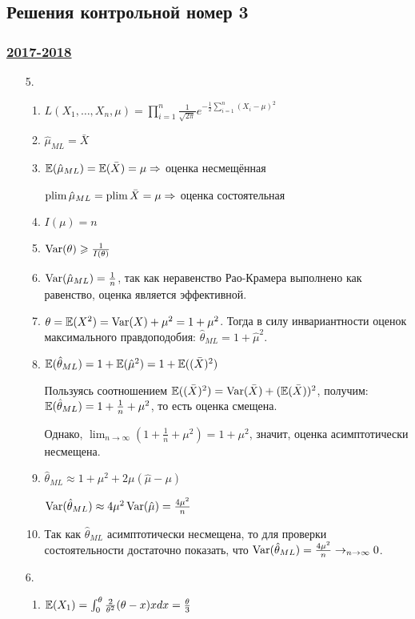 \subsection*{Решения контрольной номер 3}

\subsubsection*{\hyperref[sec:kr_03_2017_2018]{2017-2018}}
\label{sec:sol_kr_03_2017_2018}


\begin{enumerate}
\item[5.]
\begin{enumerate}
\item $L(X_1, \ldots, X_n, \mu) = \prod_{i=1}^n \frac{1}{\sqrt{2\pi}} e^{-\frac{1}{2}\sum_{i=1}^n (X_i - \mu)^2}$
\item $\hat\mu_{ML} = \bar X$
\item $\operatorname{\mathbb{E}}(\hat\mu_{ML}) = \operatorname{\mathbb{E}}(\bar X) = \mu \Rightarrow$ оценка несмещённая

$\operatorname*{plim} \hat \mu_{ML} = \operatorname*{plim} \bar X = \mu \Rightarrow$ оценка состоятельная
\item $I(\mu) = n$
\item $\operatorname{Var}(\theta) \geqslant \frac{1}{I(\theta)}$
\item $\operatorname{Var}(\hat \mu_{ML}) = \frac{1}{n}$, так как неравенство Рао-Крамера выполнено
как равенство, оценка является эффективной.
\item $\theta = \operatorname{\mathbb{E}}(X^2) = \operatorname{Var}(X) + \mu^2 = 1 + \mu^2$.
Тогда в силу инвариантности оценок максимального правдоподобия: $\hat\theta_{ML} = 1 + \hat\mu^2$.
\item $\operatorname{\mathbb{E}}(\hat \theta_{ML}) = 1 + \operatorname{\mathbb{E}}(\hat \mu^2) = 1 + \operatorname{\mathbb{E}}((\bar X)^2)$

Пользуясь соотношением $\operatorname{\mathbb{E}}((\bar X)^2) = \operatorname{Var}(\bar X) + (\operatorname{\mathbb{E}}(\bar X))^2$,
получим: $\operatorname{\mathbb{E}}(\hat \theta_{ML}) = 1 + \frac{1}{n} + \mu^2$, то есть оценка смещена.

Однако, $\lim_{n \to \infty} \left(1 + \frac{1}{n} + \mu^2\right) = 1 + \mu^2$, значит,
оценка асимптотически несмещена.
\item $\hat \theta_{ML} \approx 1 + \mu^2 + 2\mu(\hat \mu - \mu)$

$\operatorname{Var}(\hat \theta_{ML}) \approx 4 \mu^2 \operatorname{Var}(\hat \mu) = \frac{4 \mu^2}{n}$
\item Так как $\hat \theta_{ML}$ асимптотически несмещена, то для проверки
состоятельности достаточно показать, что
$\operatorname{Var}(\hat \theta_{ML}) = \frac{4\mu^2}{n} \to_{n \to \infty} 0$.
\end{enumerate}
\item[6.]
\begin{enumerate}
\item $\operatorname{\mathbb{E}}(X_1) = \int_{0}^{\theta} \frac{2}{\theta^2}(\theta - x)x dx = \frac{\theta}{3}$


\end{enumerate}
\end{enumerate}
